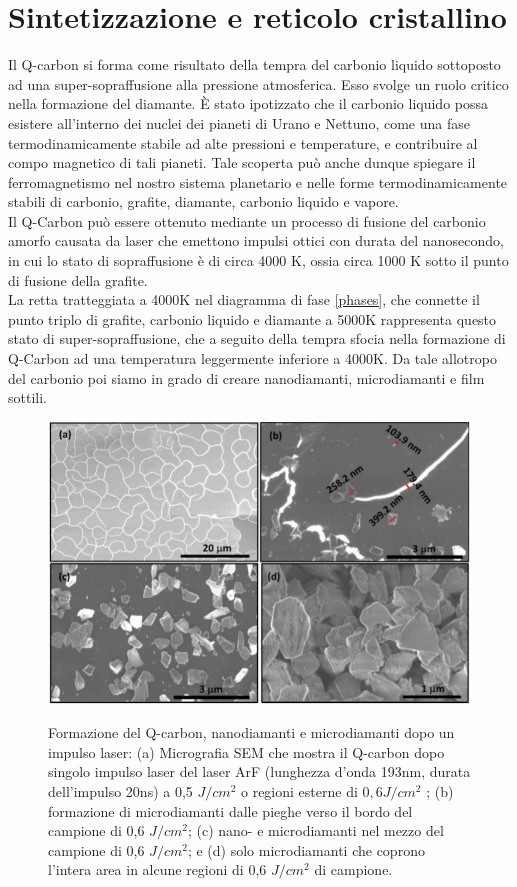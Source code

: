 \documentclass[a4paper,titlepage]{book}
\begin{document}
\section{Sintetizzazione e reticolo cristallino}
Il Q-carbon si forma come risultato della tempra del carbonio liquido sottoposto ad una super-sopraffusione alla pressione atmosferica. Esso svolge un ruolo critico nella formazione del diamante. È stato ipotizzato che il carbonio liquido possa esistere all'interno dei nuclei dei pianeti di Urano e Nettuno, come una fase termodinamicamente stabile ad alte pressioni e temperature, e contribuire al compo magnetico di tali pianeti. Tale scoperta può anche dunque  spiegare il ferromagnetismo nel nostro sistema planetario e nelle forme termodinamicamente stabili di carbonio, grafite, diamante, carbonio liquido e vapore. \\
Il Q-Carbon può essere ottenuto mediante un processo di fusione del  carbonio amorfo causata da laser che emettono impulsi ottici con durata del nanosecondo, in cui lo stato di sopraffusione è di circa 4000 K, ossia circa 1000 K sotto il punto di fusione della grafite. \\
La retta tratteggiata a 4000K nel diagramma di fase \ref{phases}, che connette il punto triplo di grafite, carbonio liquido e diamante a 5000K rappresenta questo stato di super-sopraffusione, che a seguito della tempra sfocia nella formazione di Q-Carbon ad una temperatura leggermente inferiore a 4000K. Da tale allotropo del carbonio poi siamo in grado di creare nanodiamanti, microdiamanti e film sottili. \\
\begin{figure}[h!] 
	\centering \label{Qcarbont}
	\includegraphics[width=0.55\columnwidth]{Qcarboon.png}
	\caption{ 	Formazione del Q-carbon, nanodiamanti e microdiamanti dopo un impulso laser: (a) Micrografia SEM che mostra il Q-carbon dopo singolo impulso laser del laser ArF (lunghezza d'onda 193nm, durata dell'impulso 20ns) a 0,5 $J/cm^2$ o regioni esterne di $0,6 J/cm^2$ ; (b) formazione di microdiamanti dalle pieghe verso il bordo del campione di 0,6 $J/cm^2$; (c) nano- e microdiamanti nel mezzo del campione di 0,6 $J/cm^2$; e (d) solo microdiamanti che coprono l'intera area in alcune regioni di 0,6 $J/cm^2$ di campione.
		}
\end{figure}
\end{document}
